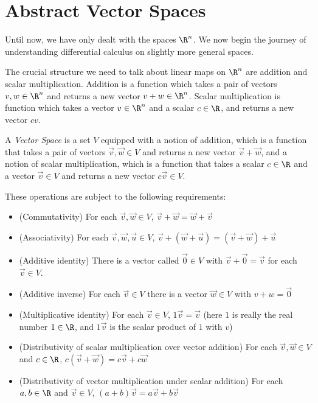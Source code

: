 
	\section{Abstract Vector Spaces}
	
	Until now, we have only dealt with the spaces $\R^n$.  We now begin the journey of understanding differential calculus on slightly more 
	general spaces.  
	
	The crucial structure we need to talk about linear maps on $\R^n$ are addition and scalar multiplication.  Addition is a function which takes a 
	pair of vectors $v,w \in \R^n$ and returns a new vector $v+w \in \R^n$.  Scalar multiplication is function which takes a vector $v \in \R^n$  and 
	a scalar $c \in \R$, and returns a new vector $cv$.  
	
	\begin{definition}
		A \textit{Vector Space} is a set $V$ equipped with a notion of addition, which is a function that takes a pair of vectors $\vec{v},\vec{w} \in V$ and returns 
		a new vector $\vec{v}+\vec{w}$, and a notion of scalar multiplication, which is a function that takes a scalar $c \in \R$ and a vector $\vec{v} \in V$ and returns a 
		new vector $c\vec{v} \in V$.
		
		These operations are subject to the following requirements:
		
		\begin{itemize}
			\item (Commutativity) For each $\vec{v},\vec{w} \in V$, $ \vec{v} +\vec{w} = \vec{w}+\vec{v}$
			\item (Associativity) For each $\vec{v},\vec{w},\vec{u} \in V$, $\vec{v} +(\vec{w} +\vec{u}) = (\vec{v} +\vec{w}) +\vec{u}$
			\item (Additive identity) There is a vector called $\vec{0} \in V$ with $\vec{v}+\vec{0} = \vec{v}$ for each $\vec{v} \in V$.
			\item (Additive inverse) For each $\vec{v} \in V$ there is a vector $\vec{w} \in V$ with $v+w = \vec{0}$
			\item (Multiplicative identity) For each $\vec{v} \in V$, $1\vec{v}= \vec{v}$ (here $1$ is really the real number $1 \in \R$, and $1\vec{v}$ is the
			scalar product of $1$ with $v$)
			\item (Distributivity of scalar multiplication over vector addition)  For each $\vec{v},\vec{w} \in V$ and $c \in \R$, $c(\vec{v}+\vec{w}) = c\vec{v} + c\vec{w}$
			\item (Distributivity of vector  multiplication under scalar addition) For each $a,b \in \R$ and $\vec{v} \in V$, $(a+b)\vec{v} = a\vec{v}+b\vec{v}$
		\end{itemize}
		
	\end{definition}
	
